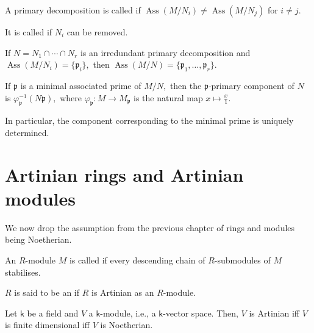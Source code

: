 \documentclass[12pt]{article}	%
\DeclareMathOperator{\Ass}{Ass}
\begin{document}
\begin{defn}
	A primary decomposition is called  if $\Ass(M/N_i) \neq \Ass(M/N_j)$ for $i \neq j.$

	It is called  if $N_i$ can be removed.
\end{defn}

\begin{thm}
	If $N = N_1 \cap \cdots \cap N_r$ is an irredundant primary decomposition and $\Ass(M/N_i) = \{\mathfrak{p}_i\},$ then $\Ass(M/N) = \{\mathfrak{p}_1, \ldots, \mathfrak{p}_r\}.$ 
\end{thm}

\begin{thm}
	If $\mathfrak{p}$ is a minimal associated prime of $M/N,$ then the $\mathfrak{p}$-primary component of $N$ is $\varphi_{\mathfrak{p}}^{-1}(N\mathfrak{p}),$ where $\varphi_{\mathfrak{p}} : M \to M_\mathfrak{p}$ is the natural map $x \mapsto \frac{x}{1}.$

	In particular, the component corresponding to the minimal prime is uniquely determined.
\end{thm}

\section{Artinian rings and Artinian modules}

We now drop the assumption from the previous chapter of rings and modules being Noetherian.

\begin{defn}%
	An $R$-module $M$ is called  if every descending chain of $R$-submodules of $M$ stabilises.

	$R$ is said to be an  if $R$ is Artinian as an $R$-module.
\end{defn}

\begin{prop}
	Let $\mathsf{k}$ be a field and $V$ a $\mathsf{k}$-module, i.e., a $\mathsf{k}$-vector space. Then, $V$ is Artinian iff $V$ is finite dimensional iff $V$ is Noetherian.
\end{prop}
\end{document}
